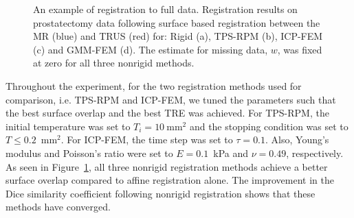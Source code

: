 \documentclass[journal]{IEEEtran}
\begin{document}
\begin{figure}
    \caption{An example of registration to full data. Registration results on prostatectomy data following surface based registration between the MR (blue) and TRUS (red) for: Rigid (a), TPS-RPM (b), ICP-FEM (c) and GMM-FEM (d). The estimate for missing data, $w$, was fixed at zero for all three nonrigid methods. \label{fig:exp2fig1}}
\end{figure}
Throughout the experiment, for the two registration methods used for comparison, i.e. TPS-RPM and ICP-FEM, we tuned the parameters such that the best surface overlap and the best TRE was achieved. For TPS-RPM, the initial temperature was set to $T_i=10~\mathrm{mm}^2$ and the stopping condition was set to $T\leq0.2$~$\mathrm{mm}^2$. For ICP-FEM, the time step was set to $\tau=0.1$. Also, Young's modulus and Poisson's ratio were set to $E=0.1$~kPa and $\nu=0.49$, respectively. As seen in Figure~\ref{fig:exp2fig1}, all three nonrigid registration methods achieve a better surface overlap compared to affine registration alone. The improvement in the Dice similarity coefficient following nonrigid registration shows that these methods have converged.
\end{document}

